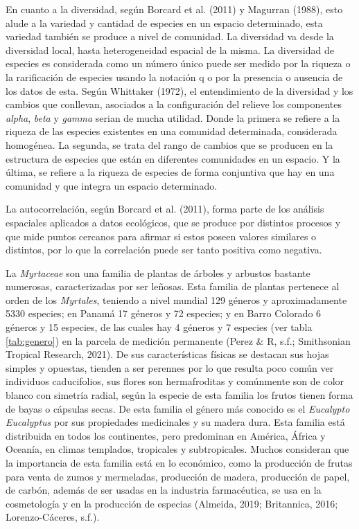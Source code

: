 \documentclass[11pt,]{article}
\begin{document}
En cuanto a la diversidad, según Borcard et al. (2011) y Magurran
(1988), esto alude a la variedad y cantidad de especies en un espacio
determinado, esta variedad también se produce a nivel de comunidad. La
diversidad va desde la diversidad local, hasta heterogeneidad espacial
de la misma. La diversidad de especies es considerada como un número
único puede ser medido por la riqueza o la rarificación de especies
usando la notación q o por la presencia o ausencia de los datos de esta.
Según Whittaker (1972), el entendimiento de la diversidad y los cambios
que conllevan, asociados a la configuración del relieve los componentes
\emph{alpha}, \emph{beta} y \emph{gamma} serian de mucha utilidad. Donde
la primera se refiere a la riqueza de las especies existentes en una
comunidad determinada, considerada homogénea. La segunda, se trata del
rango de cambios que se producen en la estructura de especies que están
en diferentes comunidades en un espacio. Y la última, se refiere a la
riqueza de especies de forma conjuntiva que hay en una comunidad y que
integra un espacio determinado.

La autocorrelación, según Borcard et al. (2011), forma parte de los
análisis espaciales aplicados a datos ecológicos, que se produce por
distintos procesos y que mide puntos cercanos para afirmar si estos
poseen valores similares o distintos, por lo que la correlación puede
ser tanto positiva como negativa.

La \emph{Myrtaceae} son una familia de plantas de árboles y arbustos
bastante numerosas, caracterizadas por ser leñosas. Esta familia de
plantas pertenece al orden de los \emph{Myrtales}, teniendo a nivel
mundial 129 géneros y aproximadamente 5330 especies; en Panamá 17
géneros y 72 especies; y en Barro Colorado 6 géneros y 15 especies, de
las cuales hay 4 géneros y 7 especies (ver tabla \ref{tab:genero}) en la
parcela de medición permanente (Perez \& R, s.f.; Smithsonian Tropical
Research, 2021). De sus características físicas se destacan sus hojas
simples y opuestas, tienden a ser perennes por lo que resulta poco común
ver individuos caducifolios, sus flores son hermafroditas y comúnmente
son de color blanco con simetría radial, según la especie de esta
familia los frutos tienen forma de bayas o cápsulas secas. De esta
familia el género más conocido es el \emph{Eucalypto Eucalyptus} por sus
propiedades medicinales y su madera dura. Esta familia está distribuida
en todos los continentes, pero predominan en América, África y Oceanía,
en climas templados, tropicales y subtropicales. Muchos consideran que
la importancia de esta familia está en lo económico, como la producción
de frutas para venta de zumos y mermeladas, producción de madera,
producción de papel, de carbón, además de ser usadas en la industria
farmacéutica, se usa en la cosmetología y en la producción de especias
(Almeida, 2019; Britannica, 2016; Lorenzo-Cáceres, s.f.).
\end{document}
